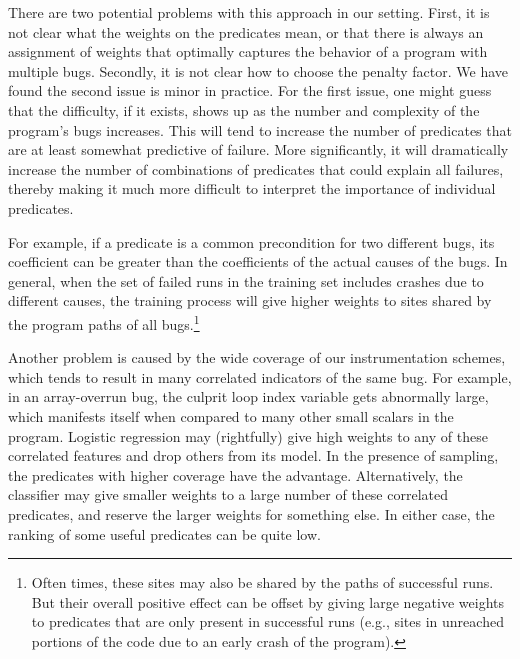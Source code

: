 There are two potential problems with
this approach in our setting.  First, it is not clear what the weights
on the predicates mean, or that there is always an assignment of
weights that optimally captures the behavior of a program with
multiple bugs.  Secondly, it is not clear how to choose the penalty
factor.  We have found the second issue is minor in practice.  For the
first issue, one might guess that the difficulty, if it exists, shows
up as the number and complexity of the program's bugs
increases.  This will tend to increase the number of predicates that
are at least somewhat predictive of failure.  More significantly, it
will dramatically increase the number of combinations of predicates that could
explain all failures, thereby making it much more difficult to interpret the 
importance of individual predicates.

For example, if a predicate is a
common precondition for two different bugs, its coefficient
can be greater than the coefficients of the actual causes of the bugs.
In general, when the set of failed runs in
the training set includes crashes due to different causes, the
training process will give higher weights to sites shared by the
program paths of all bugs.\footnote{Often times, these sites may also be
shared by the paths of successful runs.  But their overall positive
effect can be offset by giving large negative weights to predicates
that are only present in successful runs (e.g., sites in unreached
portions of the code due to an early crash of the program).}

Another problem is caused by the wide coverage of our instrumentation
schemes, which tends to result in many correlated indicators of the
same bug.  For example, in an array-overrun bug, the culprit loop
index variable gets abnormally large, which manifests itself when
compared to many other small scalars in the program.  Logistic
regression may (rightfully) give high weights to any of these
correlated features and drop others from its model.  In the presence
of sampling, the predicates with higher coverage have the advantage.
Alternatively, the classifier may give smaller weights to a large
number of these correlated predicates, and reserve the larger weights
for something else. 
In either case, the ranking of some useful predicates can be quite low.

